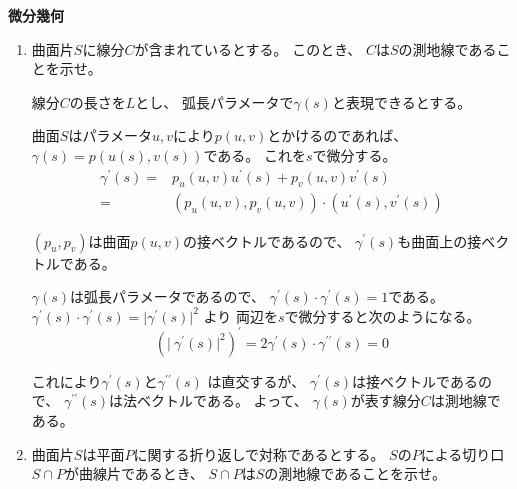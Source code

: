 \documentclass[12pt,b5paper]{ltjsarticle}
\begin{document}
\hrulefill

\textbf{微分幾何}



\hrulefill

\begin{enumerate}
 \item
      曲面片$S$に線分$C$が含まれているとする。
      このとき、
      $C$は$S$の測地線であることを示せ。

      \dotfill

      線分$C$の長さを$L$とし、
      弧長パラメータで$\gamma(s)$と表現できるとする。

      曲面$S$はパラメータ$u,v$により$p(u,v)$とかけるのであれば、
      $\gamma (s) = p(u(s),v(s))$である。
      これを$s$で微分する。
      \begin{align}
       \gamma^{\prime}(s)
        =& p_{u}(u,v)u^{\prime}(s) + p_{v}(u,v)v^{\prime}(s)\\
        =& \left(p_{u}(u,v), p_{v}(u,v)\right)\cdot \left(u^{\prime}(s), v^{\prime}(s)\right)
      \end{align}

      $(p_u,p_v)$は曲面$p(u,v)$の接ベクトルであるので、
      $\gamma^{\prime}(s)$も曲面上の接ベクトルである。

      $\gamma(s)$は弧長パラメータであるので、
      $\gamma^{\prime}(s)\cdot\gamma^{\prime}(s)=1$である。
      $\gamma^{\prime}(s)\cdot\gamma^{\prime}(s)=\lvert\gamma^{\prime}(s) \rvert^2$
      より
      両辺を$s$で微分すると次のようになる。
      \begin{equation}
       (\lvert\ \gamma^{\prime}(s) \rvert^2)^{\prime}
        = 2 \gamma^{\prime}(s)\cdot \gamma^{\prime\prime}(s) =0
      \end{equation}

      これにより$\gamma^{\prime}(s)$と$\gamma^{\prime\prime}(s)$
      は直交するが、
      $\gamma^{\prime}(s)$は接ベクトルであるので、
      $\gamma^{\prime\prime}(s)$は法ベクトルである。
      よって、
      $\gamma(s)$が表す線分$C$は測地線である。

      \hrulefill

 \item
      曲面片$S$は平面$P$に関する折り返しで対称であるとする。
      $S$の$P$による切り口$S\cap P$が曲線片であるとき、
      $S\cap P$は$S$の測地線であることを示せ。


\end{enumerate}
\end{document}
